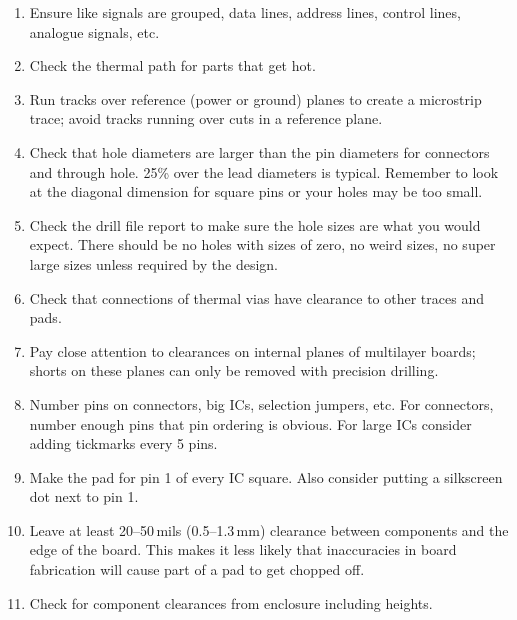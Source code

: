 \begin{enumerate}

\item Ensure like signals are grouped, data lines, address lines, control lines, analogue signals, etc.

\item Check the thermal path for parts that get hot.

\item Run tracks over reference (power or ground) planes to create a
  microstrip trace; avoid tracks running over cuts in a reference
  plane.

\item Check that hole diameters are larger than the pin diameters for
  connectors and through hole. 25\% over the lead diameters is
  typical.  Remember to look at the diagonal dimension for square pins
  or your holes may be too small.

\item Check the drill file report to make sure the hole sizes are what
  you would expect. There should be no holes with sizes of zero, no
  weird sizes, no super large sizes unless required by the design.

\item Check that connections of thermal vias have clearance to other
  traces and pads.

\item Pay close attention to clearances on internal planes of
  multilayer boards; shorts on these planes can only be removed with
  precision drilling.

\item Number pins on connectors, big ICs, selection jumpers, etc. For
  connectors, number enough pins that pin ordering is obvious. For
  large ICs consider adding tickmarks every 5 pins.

\item Make the pad for pin 1 of every IC square. Also consider putting
  a silkscreen dot next to pin 1.

\item Leave at least 20--50\,mils (0.5--1.3\,mm) clearance between
  components and the edge of the board. This makes it less likely that
  inaccuracies in board fabrication will cause part of a pad to get
  chopped off.

\item Check for component clearances from enclosure including heights.


\end{enumerate}
